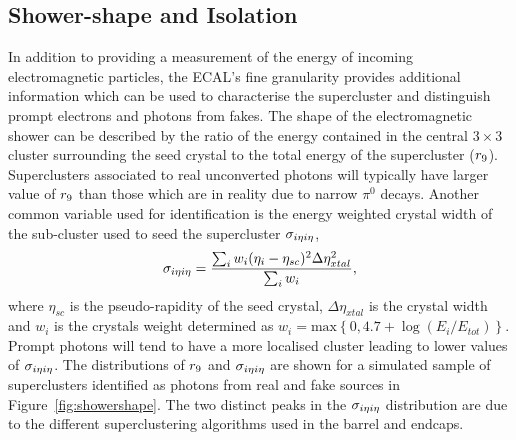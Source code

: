 \subsection{Shower-shape and Isolation}
In addition to providing a measurement of the energy of incoming electromagnetic particles,
the ECAL's fine granularity provides additional information which can be used to characterise
the supercluster and distinguish prompt electrons and photons from fakes.  
The shape of the electromagnetic shower can be described by the ratio of the energy contained
in the central $3\times3$ cluster surrounding the seed crystal to the total energy of the supercluster
($r_{9}$). Superclusters associated to real unconverted photons will typically have larger value of 
$r_{9}$ than those which are in reality due to narrow $\pi^{0}$ decays. Another common variable used
for identification is the energy weighted crystal width of the sub-cluster used to seed the supercluster  
$\sigma_{i\eta i\eta}$, 
\begin{equation}
\sigma_{i\eta i\eta} = \frac{\sum_{i}w_{i}(\eta_{i}-\eta_{sc})^{2}\Delta\eta^{2}_{xtal}}{\sum_{i}w_{i}},
\end{equation}
where $\eta_{sc}$ is the pseudo-rapidity of the seed crystal, $\Delta\eta_{xtal}$ is the crystal width
and $w_{i}$ is the crystals weight determined as $w_{i} = \mathrm{max}\left\{0,4.7+\log(E_{i}/E_{tot})\right\}$.
Prompt photons will tend to have a more localised cluster leading to lower values of $\sigma_{i\eta i\eta}$. 
The distributions of $r_{9}$ and $\sigma_{i\eta i\eta}$ are shown for a simulated sample of 
superclusters identified as photons from real and fake sources in Figure~\ref{fig:showershape}.
The two distinct peaks in the $\sigma_{i\eta i\eta}$ distribution are due to the different superclustering algorithms 
used in the barrel and endcaps.

